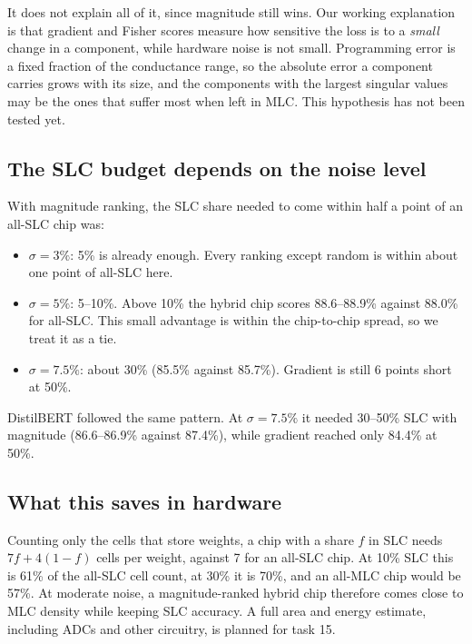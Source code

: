 \documentclass[10pt,a4paper]{article}
\begin{document}
It does not explain all of it, since magnitude still wins. Our working explanation is that gradient and
Fisher scores measure how sensitive the loss is to a \emph{small} change in a component, while hardware
noise is not small. Programming error is a fixed fraction of the conductance range, so the absolute error
a component carries grows with its size, and the components with the largest singular values may be the
ones that suffer most when left in MLC. This hypothesis has not been tested yet.

\subsection{The SLC budget depends on the noise level}
With magnitude ranking, the SLC share needed to come within half a point of an all-SLC chip was:
\begin{itemize}
\item $\sigma=3\%$: 5\% is already enough. Every ranking except random is within about one point of
all-SLC here.
\item $\sigma=5\%$: 5--10\%. Above 10\% the hybrid chip scores 88.6--88.9\% against 88.0\% for all-SLC.
This small advantage is within the chip-to-chip spread, so we treat it as a tie.
\item $\sigma=7.5\%$: about 30\% (85.5\% against 85.7\%). Gradient is still 6 points short at 50\%.
\end{itemize}
DistilBERT followed the same pattern. At $\sigma=7.5\%$ it needed 30--50\% SLC with magnitude
(86.6--86.9\% against 87.4\%), while gradient reached only 84.4\% at 50\%.

\subsection{What this saves in hardware}
Counting only the cells that store weights, a chip with a share $f$ in SLC needs $7f + 4(1-f)$ cells per
weight, against 7 for an all-SLC chip. At 10\% SLC this is 61\% of the all-SLC cell count, at 30\% it is
70\%, and an all-MLC chip would be 57\%. At moderate noise, a magnitude-ranked hybrid chip therefore comes
close to MLC density while keeping SLC accuracy. A full area and energy estimate, including ADCs and other
circuitry, is planned for task 15.
\end{document}
